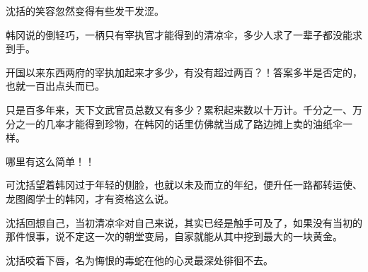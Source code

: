 沈括的笑容忽然变得有些发干发涩。

韩冈说的倒轻巧，一柄只有宰执官才能得到的清凉伞，多少人求了一辈子都没能求到手。

开国以来东西两府的宰执加起来才多少，有没有超过两百？！答案多半是否定的，也就一百出点头而已。

只是百多年来，天下文武官员总数又有多少？累积起来数以十万计。千分之一、万分之一的几率才能得到珍物，在韩冈的话里仿佛就当成了路边摊上卖的油纸伞一样。

哪里有这么简单！！

可沈括望着韩冈过于年轻的侧脸，也就以未及而立的年纪，便升任一路都转运使、龙图阁学士的韩冈，才有资格这么说。

沈括回想自己，当初清凉伞对自己来说，其实已经是触手可及了，如果没有当初的那件恨事，说不定这一次的朝堂变局，自家就能从其中挖到最大的一块黄金。

沈括咬着下唇，名为悔恨的毒蛇在他的心灵最深处徘徊不去。

